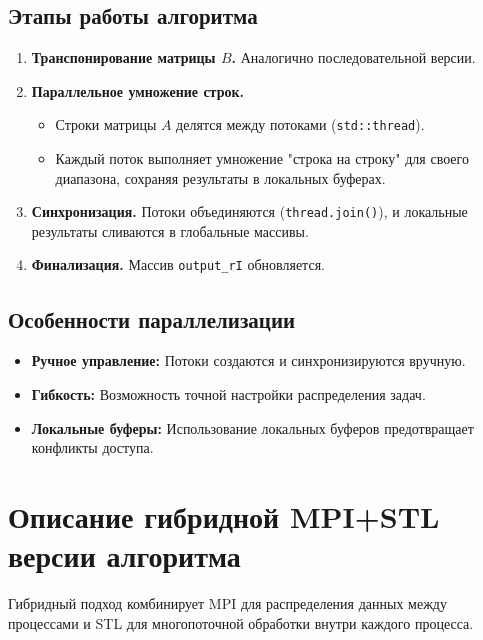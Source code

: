 \documentclass[a4paper,12pt]{article}
\begin{document}
\subsection{Этапы работы алгоритма}
\begin{enumerate}
    \item \textbf{Транспонирование матрицы \( B \).} Аналогично последовательной версии.
    \item \textbf{Параллельное умножение строк.}
    \begin{itemize}
        \item Строки матрицы \( A \) делятся между потоками (\texttt{std::thread}).
        \item Каждый поток выполняет умножение "строка на строку" для своего диапазона, сохраняя результаты в локальных буферах.
    \end{itemize}
    \item \textbf{Синхронизация.} Потоки объединяются (\texttt{thread.join()}), и локальные результаты сливаются в глобальные массивы.
    \item \textbf{Финализация.} Массив \texttt{output\_rI} обновляется.
\end{enumerate}

\subsection{Особенности параллелизации}
\begin{itemize}
    \item \textbf{Ручное управление:} Потоки создаются и синхронизируются вручную.
    \item \textbf{Гибкость:} Возможность точной настройки распределения задач.
    \item \textbf{Локальные буферы:} Использование локальных буферов предотвращает конфликты доступа.
\end{itemize}

\section{Описание гибридной MPI+STL версии алгоритма}
Гибридный подход комбинирует MPI для распределения данных между процессами и STL для многопоточной обработки внутри каждого процесса.
\end{document}
